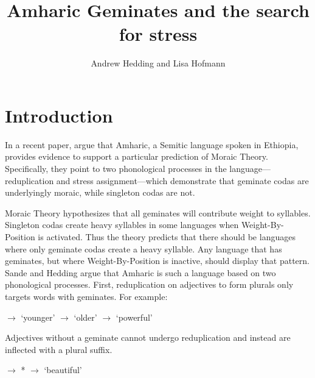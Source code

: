 \documentclass[12pt]{article}
\title{Amharic Geminates and the search for stress}
\author{Andrew Hedding and Lisa Hofmann}
\begin{document}
\maketitle
\section{Introduction}

In a recent paper, \cite{sande2017} argue that Amharic, a Semitic language spoken in Ethiopia, provides evidence to support a particular prediction of Moraic Theory. Specifically, they point to two phonological processes in the language---reduplication and stress assignment---which demonstrate that geminate codas are underlyingly moraic, while singleton codas are not. 

Moraic Theory hypothesizes that all geminates will contribute weight to syllables. Singleton codas create heavy syllables in some languages when Weight-By-Position is activated. Thus the theory predicts that there should be languages where only geminate codas create a heavy syllable. Any language that has geminates, but where Weight-By-Position is inactive, should display that pattern. Sande and Hedding argue that Amharic is such a language based on two phonological processes. First, reduplication on adjectives to form plurals only targets words with geminates. For example:

\begin{exe}
\begin{xlist}
\ex 	{} $\rightarrow$  \hspace{1cm} `younger'
\ex 	{} $\rightarrow$  \hspace{1.18cm} `older'
\ex 	{} $\rightarrow$  \hspace{1.37cm} `powerful'
\end{xlist}
\end{exe}

Adjectives without a geminate cannot undergo reduplication and instead are inflected with a plural suffix. 

\begin{exe}
\begin{xlist}
\ex 	{} $\rightarrow$ * 
\ex 	{} $\rightarrow$  \hspace{1cm} `beautiful'
\end{xlist}
\end{exe}
\end{document}
